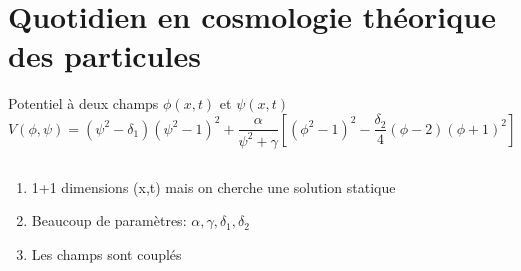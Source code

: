 \documentclass[handout]{beamer}
\begin{document}
\section{Quotidien en cosmologie théorique des particules}
\begin{frame}
\begin{block}{Potentiel à deux champs $\phi(x,t)$ et $\psi(x,t)$}
\begin{equation*}
V(\phi,\psi)=(\psi^2-\delta_1)(\psi^2-1)^2+\frac{\alpha}{\psi^2+\gamma}[(\phi^2-1)^2 - \frac{\delta_2}{4}(\phi-2)(\phi+1)^2] 
\end{equation*}
\begin{columns}[T]
    \begin{column}[T]{.5\linewidth}
  
\begin{enumerate}
\item 1+1 dimensions (x,t) mais on cherche une solution statique
\item Beaucoup de paramètres: $\alpha, \gamma, \delta_1, \delta_2$
\item Les champs sont couplés
\end{enumerate}  
    \end{column}
    \begin{column}[T]{.5\linewidth}
    \begin{figure}[0.3\textwidth]
    \end{figure}
    \end{column}
  \end{columns}
\end{block}
\end{frame}
\end{document}
